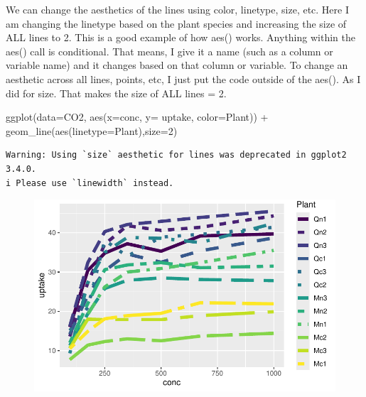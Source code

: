 \documentclass[
  letterpaper,
  DIV=11,
  numbers=noendperiod]{scrartcl}
\newenvironment{Shaded}{\begin{snugshade}}{\end{snugshade}}
\newcommand{\AttributeTok}[1]{\textcolor[rgb]{0.40,0.45,0.13}{#1}}
\newcommand{\DecValTok}[1]{\textcolor[rgb]{0.68,0.00,0.00}{#1}}
\newcommand{\FunctionTok}[1]{\textcolor[rgb]{0.28,0.35,0.67}{#1}}
\newcommand{\NormalTok}[1]{\textcolor[rgb]{0.00,0.23,0.31}{#1}}
\newcommand{\SpecialCharTok}[1]{\textcolor[rgb]{0.37,0.37,0.37}{#1}}
\begin{document}
We can change the aesthetics of the lines using color, linetype, size,
etc. Here I am changing the linetype based on the plant species and
increasing the size of ALL lines to 2. This is a good example of how
aes() works. Anything within the aes() call is conditional. That means,
I give it a name (such as a column or variable name) and it changes
based on that column or variable. To change an aesthetic across all
lines, points, etc, I just put the code outside of the aes(). As I did
for size. That makes the size of ALL lines = 2.

\begin{Shaded}
\begin{Highlighting}[]
\FunctionTok{ggplot}\NormalTok{(}\AttributeTok{data=}\NormalTok{CO2, }\FunctionTok{aes}\NormalTok{(}\AttributeTok{x=}\NormalTok{conc, }\AttributeTok{y=}\NormalTok{ uptake, }\AttributeTok{color=}\NormalTok{Plant)) }\SpecialCharTok{+}
  \FunctionTok{geom\_line}\NormalTok{(}\FunctionTok{aes}\NormalTok{(}\AttributeTok{linetype=}\NormalTok{Plant),}\AttributeTok{size=}\DecValTok{2}\NormalTok{)}
\end{Highlighting}
\end{Shaded}

\begin{verbatim}
Warning: Using `size` aesthetic for lines was deprecated in ggplot2 3.4.0.
i Please use `linewidth` instead.
\end{verbatim}

\begin{figure}[H]

{\centering \includegraphics{Lab_2_files/figure-pdf/unnamed-chunk-14-1.pdf}

}

\end{figure}
\end{document}

